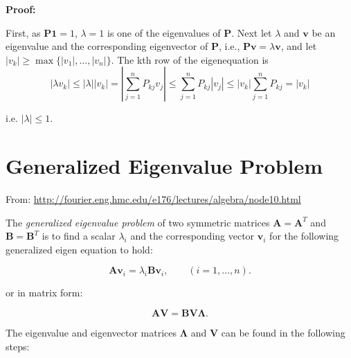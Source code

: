 \documentclass[10pt,b5paper,titlepage]{book}
\begin{document}
\begin{itemize}
\textbf{Proof: }

First, as $\mathbf{P1} = 1$, $\lambda = 1$ is one of the eigenvalues of $\mathbf{P}$. Next let $\lambda$ and $\mathbf{v}$ be an eigenvalue and the corresponding eigenvector of $\mathbf{P}$, i.e., $\mathbf{P} \mathbf{v} = \lambda \mathbf{v}$, and let $|v_{k}| \ge \max\{|v_{1}|, \dots, |v_{n}|\}$. The kth row of the eigenequation is
\begin{equation}
|\lambda v_{k}| \leq |\lambda| |v_{k}| = \left\lvert{\sum_{j=1}^{n}P_{kj}v_{j}}\right\rvert \leq \sum_{j=1}^{n} P_{kj} |v_{j}| \leq  |v_{k}| \sum_{j=1}^{n} P_{kj} = |v_{k}|
\end{equation}

i.e. $|\lambda| \leq 1$.
\end{itemize}



\chapter{Generalized Eigenvalue Problem}

From: \url{http://fourier.eng.hmc.edu/e176/lectures/algebra/node10.html}

The \textit{generalized eigenvalue problem} of two symmetric matrices
$\mathbf{A} = \mathbf{A}^{T}$ and $\mathbf{B} = \mathbf{B}^{T}$ is to find a scalar
$\lambda_{i}$ and the corresponding vector $\mathbf{v}_{i}$ for the following
generalized eigen equation to hold:

\begin{equation}
    \mathbf{A}\mathbf{v}_{i} = \lambda_{i}\mathbf{B}\mathbf{v}_{i},
    \qquad (i = 1, \ldots, n)
.\end{equation}

or in matrix form:

\begin{equation}
    \mathbf{A}\mathbf{V} = \mathbf{B}\mathbf{V}\mathbf{\Lambda}
.\end{equation}

The eigenvalue and eigenvector matrices $\mathbf{\Lambda}$ and $\mathbf{V}$ can
be found in the following steps:
\end{document}
